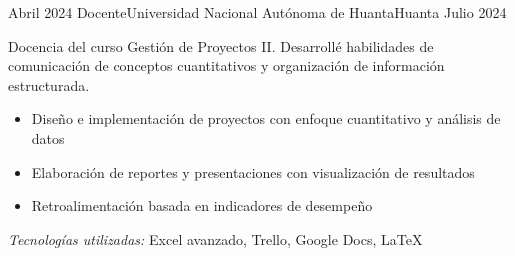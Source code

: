 \begin{experiences}
\emptySeparator

\experience
{Abril 2024} {Docente}{Universidad Nacional Autónoma de Huanta}{Huanta}
{Julio 2024} {
	Docencia del curso Gestión de Proyectos II. Desarrollé habilidades de comunicación de conceptos cuantitativos y organización de información estructurada.
	\begin{itemize}
		\item Diseño e implementación de proyectos con enfoque cuantitativo y análisis de datos
		\item Elaboración de reportes y presentaciones con visualización de resultados
		\item Retroalimentación basada en indicadores de desempeño
	\end{itemize}
}
{\footnotesize{\emph{Tecnologías utilizadas:} Excel avanzado, Trello, Google Docs, LaTeX}}




\end{experiences}




